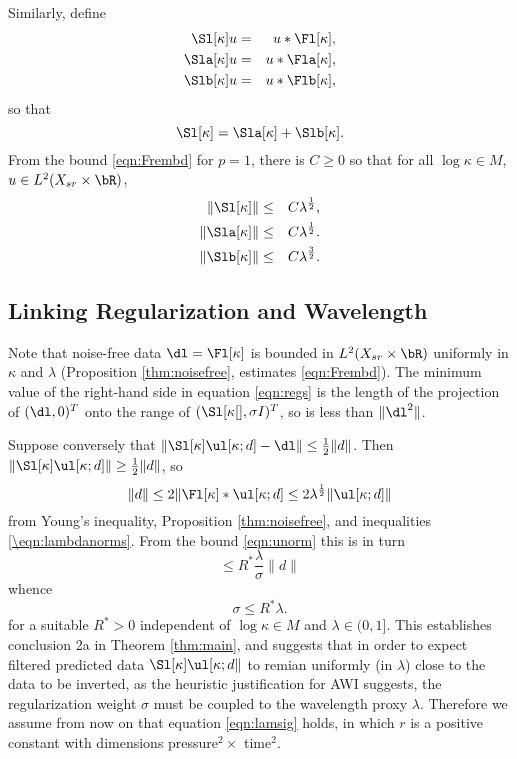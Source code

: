 Similarly, define
\begin{eqnarray}
  \label{eqn:sdeflam}
  \Sl[\kappa]u &=& u *\Fl[\kappa],  \nonumber \\
  \Sla[\kappa]u &=& u *\Fla[\kappa], \nonumber\\
  \Slb[\kappa]u &=& u *\Flb[\kappa], 
\end{eqnarray}
so that
\[
  \Sl[\kappa] = \Sla[\kappa] + \Slb[\kappa].
\]
From the bound \ref{eqn:Frembd} for $p=1$, there is $C \ge 0$ so that
for all $\log \kappa \in M$, $u \in L^2(X_{sr} \times \bR)$,
\begin{eqnarray}
  \label{eqn:Srembd}
  \|\Sl[\kappa]\| &\le&  C\lambda^{\frac{1}{2}},\nonumber \\
  \|\Sla[\kappa]\|& \le& C\lambda^{\frac{1}{2}}. \nonumber \\
  \|\Slb[\kappa]\| & \le& C\lambda^{\frac{3}{2}}.
\end{eqnarray}

\subsection{Linking Regularization and Wavelength}
Note that noise-free data $\dl = \Fl[\kappa]$ is bounded in $L^2(X_{sr}
\times \bR)$ uniformly in $\kappa$ and $\lambda$  (Proposition
\ref{thm:noisefree}, estimates \ref{eqn:Frembd}). 
The minimum value of the right-hand side in equation \ref{eqn:regs} is
the length of the projection of $(\dl,0)^T$ onto the range of
$(\Sl[\kappa[],\sigma I)^T$, so is less than $\|\dl^2\|$.

Suppose conversely that $\|\Sl[\kappa]\ul[\kappa;d] - \dl\| \le
\frac{1}{2}\|d\|$. Then $\|\Sl[\kappa]\ul[\kappa;d] \| \ge
\frac{1}{2}\|d\|$, so
\[
  \|d\| \le 2\|\Fl[\kappa]*\ul[\kappa;d] \le
  2\lambda^{\frac{1}{2}}\|\ul[\kappa;d]\|
\]
from Young's inequality, Proposition \ref{thm:noisefree}, and
inequalities \ref{\eqn:lambdanorms}. From the bound \ref{eqn:unorm} this is in
turn
\[
  \le R^* \frac{\lambda}{\sigma} \|d\|
\]
whence
\[
  \sigma \le R^* \lambda.
\]
for a suitable $R^*>0$ independent of $\log \kappa \in M$ and $\lambda
\in (0,1]$. This establishes conclusion 2a in Theorem \ref{thm:main}, and
suggests that in order to expect filtered predicted data
$\Sl[\kappa]\ul[\kappa;d\|$ to remian uniformly (in $\lambda$) close to the data to be
inverted, as the heuristic justification for AWI suggests, the
regularization weight $\sigma$ must be coupled to the wavelength proxy
$\lambda$. Therefore we assume from now on that equation
\ref{eqn:lamsig} holds,  
in which $r$ is a positive constant with dimensions pressure$^2 \times 
$ time$^2$.

